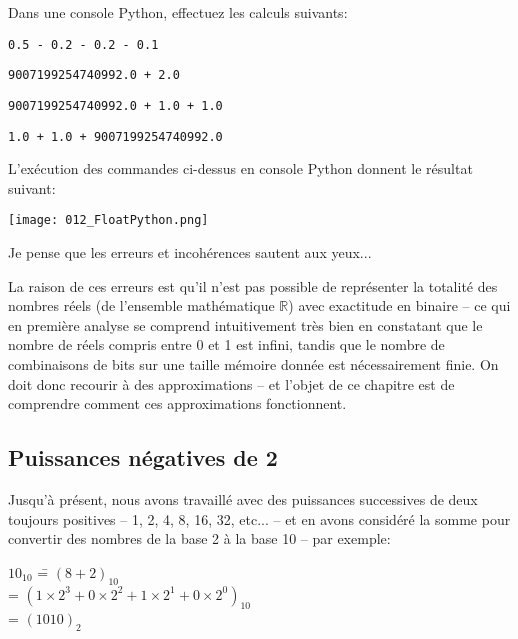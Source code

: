 \documentclass[12pt]{article}
\begin{document}
	\vspace{0.5\baselineskip}
	
	\begin{MonExo}
		Dans une console Python, effectuez les calculs suivants:
		\begin{alphenum}
			\item \texttt{0.5 - 0.2 - 0.2 - 0.1}
			\item \texttt{9007199254740992.0 + 2.0}
			\item \texttt{9007199254740992.0 + 1.0 + 1.0}
			\item \texttt{1.0 + 1.0 + 9007199254740992.0}
		\end{alphenum}
	\end{MonExo}
	\begin{MaReponse}
		L'exécution des commandes ci-dessus en console Python donnent le résultat suivant:
		\par
			\begin{minipage}{0.95\textwidth}
			\centering
			\texttt{[image: 012\_FloatPython.png]}
		\end{minipage}
		\par
		Je pense que les erreurs et incohérences sautent aux yeux...
	\end{MaReponse}
	
	La raison de ces erreurs est qu'il n'est pas possible de représenter la totalité des nombres réels (de l'ensemble mathématique $\mathbb{R}$) avec exactitude en binaire -- ce qui en première analyse se comprend intuitivement très bien en constatant que le nombre de réels compris entre 0 et 1 est infini, tandis que le nombre de combinaisons de bits sur une taille mémoire donnée est nécessairement finie. On doit donc recourir à des approximations -- et l'objet de ce chapitre est de comprendre comment ces approximations fonctionnent.
	
	\subsection{Puissances négatives de 2}
	Jusqu'à présent, nous avons travaillé avec des puissances successives de deux toujours positives -- 1, 2, 4, 8, 16, 32, etc... -- et en avons considéré la somme pour convertir des nombres de la base 2 à la base 10 -- par exemple:
	\begin{tabbing}
		$10_{10}$ \==  $(8 + 2)_{10}$ \\
		\>= $(1 \times 2^{3} + 0 \times 2^{2} + 1 \times 2^{1} + 0 \times 2^{0})_{10}$ \\
		\>= $(1010)_{2}$
	\end{tabbing}
	
\end{document}
